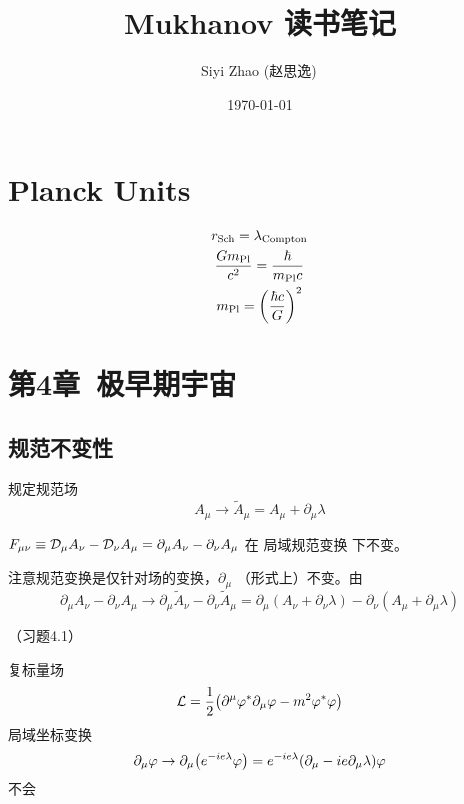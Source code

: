 \documentclass{ctexart}
\begin{document}
\title{Mukhanov 读书笔记}
\author{Siyi Zhao (赵思逸)\,}
\date{\today}

\maketitle
\tableofcontents


\section*{Planck Units}

\begin{gather}
    r_{\rm Sch} = \lambda_{\rm Compton} \\
    \frac{G m_{\rm Pl}}{c^2} = \frac{\hbar}{m_{\rm Pl} c} \\ 
    m_{\rm Pl} = {\qty(\frac{\hbar c}{G})}^2
\end{gather}



\section{第4章~极早期宇宙}

\subsection{规范不变性}
规定规范场
\begin{equation} \label{Amu}
    A_\mu \rightarrow \tilde{A}_\mu = A_\mu + \partial_\mu \lambda
\end{equation}

\begin{example}
    $F_{\mu\nu} \equiv \mathcal{D} _\mu A_\nu - \mathcal{D}_\nu A_\mu = \partial_\mu A_\nu - \partial_\nu A_\mu$ 在 局域规范变换 下不变。

    注意规范变换是仅针对场的变换，$\partial_\mu$ （形式上）不变。由 
    \begin{equation}
        \partial_\mu A_\nu - \partial_\nu A_\mu \rightarrow \partial_\mu \tilde{A}_\nu - \partial_\nu \tilde{A}_\mu = \partial_\mu (A_\nu + \partial_\nu \lambda) - \partial_\nu (A_\mu + \partial_\mu \lambda)
    \end{equation}
\end{example}

\begin{exercise}
    （习题4.1）

    复标量场
    \begin{equation}
        \mathcal{L} = \frac{1}{2} \qty(\partial ^\mu \varphi^* \partial _\mu \varphi - m^2 \varphi^* \varphi)
    \end{equation} 
    局域坐标变换 
    \begin{equation}
        \partial_\mu \varphi  \rightarrow \partial_\mu \qty(e^{-i e \lambda} \varphi) =  e^{-i e \lambda} \qty(\partial_\mu  - i e \partial_\mu \lambda ) \varphi
    \end{equation}
    不会
\end{exercise}
\end{document}
